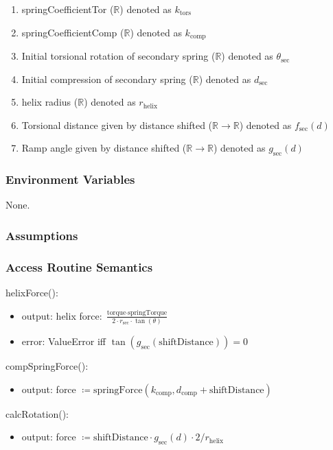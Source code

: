 \documentclass[12pt, titlepage]{article}
\begin{document}
\begin{enumerate}
  \item springCoefficientTor ($\mathbb{R}$) denoted as $k_{\text{tors}}$
  \item springCoefficientComp ($\mathbb{R}$) denoted as $k_{\text{comp}}$
  \item Initial torsional rotation of secondary spring ($\mathbb{R}$) denoted as $\theta_{\text{sec}}$
  \item Initial compression of secondary spring ($\mathbb{R}$) denoted as $d_{\text{sec}}$
  \item helix radius ($\mathbb{R}$) denoted as $r_{\text{helix}}$
  \item Torsional distance given by distance shifted ($\mathbb{R} \rightarrow \mathbb{R}$) denoted as $f_{\text{sec}}(d)$
  \item Ramp angle given by distance shifted ($\mathbb{R} \rightarrow \mathbb{R}$) denoted as $g_{\text{sec}}(d)$
\end{enumerate}

\subsubsection{Environment Variables}
None.

\subsubsection{Assumptions}

\subsubsection{Access Routine Semantics}

\noindent helixForce():
\begin{itemize}
  \item output: helix force: $\frac{\text{torque} \cdot \text{springTorque}}{2 \cdot r_\text{sec} \cdot \tan(\theta)}$
  \item error: ValueError iff $\tan(g_{\text{sec}}(\text{shiftDistance})) = 0$
\end{itemize}

\noindent compSpringForce():
\begin{itemize}
  \item output: force $\coloneq \text{springForce} (k_\text{comp}, d_\text{comp} + \text{shiftDistance}) $
\end{itemize}

\noindent calcRotation():
\begin{itemize}
  \item output: force $\coloneq \text{shiftDistance} \cdot g_{\text{sec}}(d) \cdot 2 / r_\text{helix} $
\end{itemize}
\end{document}
